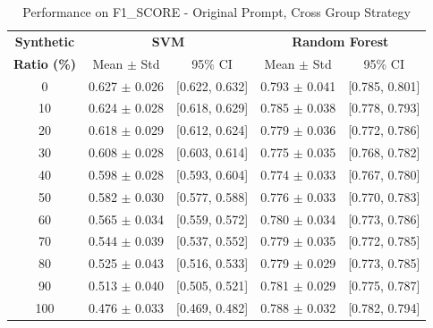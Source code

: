 \begin{table}[h]
\centering
\caption{Performance on F1_SCORE - Original Prompt, Cross Group Strategy}
\label{tab:original_cross_group_f1_score}
\begin{tabular}{c|cc|cc}
\hline
\textbf{Synthetic} & \multicolumn{2}{c|}{\textbf{SVM}} & \multicolumn{2}{c}{\textbf{Random Forest}} \\
\textbf{Ratio (\%)} & Mean $\pm$ Std & 95\% CI & Mean $\pm$ Std & 95\% CI \\
\hline
0 & 0.627 $\pm$ 0.026 & [0.622, 0.632] & 0.793 $\pm$ 0.041 & [0.785, 0.801] \\
10 & 0.624 $\pm$ 0.028 & [0.618, 0.629] & 0.785 $\pm$ 0.038 & [0.778, 0.793] \\
20 & 0.618 $\pm$ 0.029 & [0.612, 0.624] & 0.779 $\pm$ 0.036 & [0.772, 0.786] \\
30 & 0.608 $\pm$ 0.028 & [0.603, 0.614] & 0.775 $\pm$ 0.035 & [0.768, 0.782] \\
40 & 0.598 $\pm$ 0.028 & [0.593, 0.604] & 0.774 $\pm$ 0.033 & [0.767, 0.780] \\
50 & 0.582 $\pm$ 0.030 & [0.577, 0.588] & 0.776 $\pm$ 0.033 & [0.770, 0.783] \\
60 & 0.565 $\pm$ 0.034 & [0.559, 0.572] & 0.780 $\pm$ 0.034 & [0.773, 0.786] \\
70 & 0.544 $\pm$ 0.039 & [0.537, 0.552] & 0.779 $\pm$ 0.035 & [0.772, 0.785] \\
80 & 0.525 $\pm$ 0.043 & [0.516, 0.533] & 0.779 $\pm$ 0.029 & [0.773, 0.785] \\
90 & 0.513 $\pm$ 0.040 & [0.505, 0.521] & 0.781 $\pm$ 0.029 & [0.775, 0.787] \\
100 & 0.476 $\pm$ 0.033 & [0.469, 0.482] & 0.788 $\pm$ 0.032 & [0.782, 0.794] \\
\hline
\end{tabular}
\end{table}